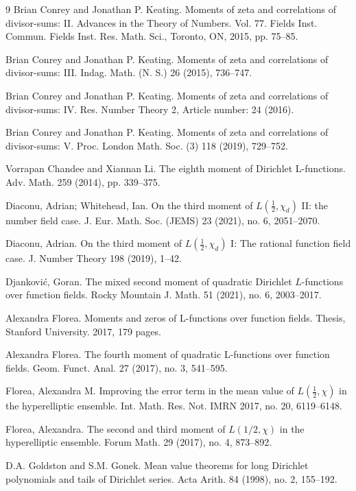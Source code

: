 \documentclass[12pt]{amsart}
\begin{document}
\begin{thebibliography}{9}
		 Brian Conrey and Jonathan P. Keating. Moments of zeta and correlations of divisor-sums: II. Advances
		in the Theory of Numbers. Vol. 77. Fields Inst. Commun. Fields Inst. Res. Math. Sci., Toronto, ON, 2015, pp. 75–85.
		
		 Brian Conrey and Jonathan P. Keating. Moments of zeta and correlations of divisor-sums: III. Indag.
		Math. (N. S.) 26 (2015), 736–747.
		
		 Brian Conrey and Jonathan P. Keating. Moments of zeta and correlations of divisor-sums: IV. Res.
		Number Theory 2, Article number: 24 (2016).
		
		 Brian Conrey and Jonathan P. Keating. Moments of zeta and correlations of divisor-sums: V. Proc.
		London Math. Soc. (3) 118 (2019), 729–752.
		
		 Vorrapan Chandee and Xiannan Li. The eighth moment of Dirichlet L-functions.
		Adv. Math. 259 (2014), pp. 339–375.
		
		 Diaconu, Adrian; Whitehead, Ian. On the third moment of $L(\frac{1}{2}, \chi_d)$ II: the number field case. J. Eur. Math. Soc. (JEMS) 23 (2021), no. 6, 2051--2070.
		
		 Diaconu, Adrian. On the third moment of $L(\frac{1}{2},\chi_d)$ I: The rational function field case. J. Number Theory 198 (2019), 1--42.  
		
		 Djanković, Goran. The mixed second moment of quadratic Dirichlet $L$-functions over function fields. Rocky Mountain J. Math. 51 (2021), no. 6, 2003--2017.
		
		 Alexandra Florea. Moments and zeros of L-functions over function fields. Thesis, Stanford University. 2017,  179 pages.
		
		 Alexandra Florea. The fourth moment of quadratic L-functions over function fields.  Geom. Funct. Anal. 27 (2017), no. 3, 541--595.
		
		 Florea, Alexandra M. Improving the error term in the mean value of $L(\frac12,\chi)$ in the hyperelliptic ensemble. Int. Math. Res. Not. IMRN 2017, no. 20, 6119--6148.
		
		 Florea, Alexandra. The second and third moment of $L(1/2,\chi)$ in the hyperelliptic ensemble. Forum Math. 29 (2017), no. 4, 873--892.
		
		D.A.  Goldston and S.M.  Gonek.  Mean value theorems for long Dirichlet polynomials and tails of 
		Dirichlet series. Acta Arith. 84 (1998), no. 2, 155--192.
		

\end{thebibliography}
\end{document}
